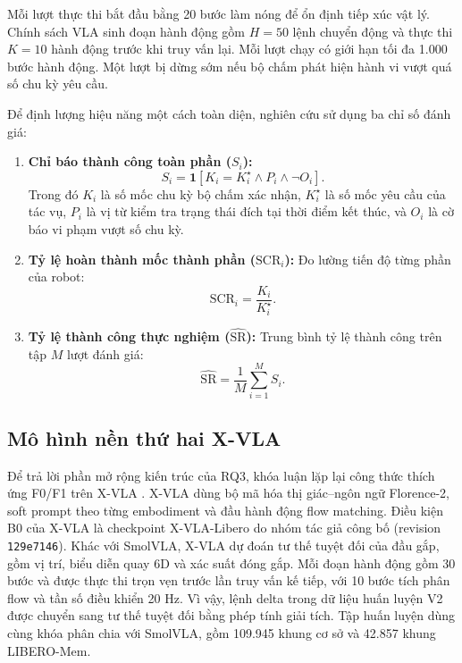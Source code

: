 Mỗi lượt thực thi bắt đầu bằng 20 bước làm nóng để ổn định tiếp xúc vật lý. Chính sách VLA sinh đoạn hành động gồm $H = 50$ lệnh chuyển động và thực thi $K = 10$ hành động trước khi truy vấn lại. Mỗi lượt chạy có giới hạn tối đa 1.000 bước hành động. Một lượt bị dừng sớm nếu bộ chấm phát hiện hành vi vượt quá số chu kỳ yêu cầu.

Để định lượng hiệu năng một cách toàn diện, nghiên cứu sử dụng ba chỉ số đánh giá:
\begin{enumerate}
    \item \textbf{Chỉ báo thành công toàn phần ($S_i$):}
    \begin{equation}
    S_i = \mathbf{1}[K_i = K_i^\star \land P_i \land \neg O_i].
    \end{equation}
    Trong đó $K_i$ là số mốc chu kỳ bộ chấm xác nhận, $K_i^\star$ là số mốc yêu cầu của tác vụ, $P_i$ là vị từ kiểm tra trạng thái đích tại thời điểm kết thúc, và $O_i$ là cờ báo vi phạm vượt số chu kỳ.
    \item \textbf{Tỷ lệ hoàn thành mốc thành phần ($\mathrm{SCR}_i$):} Đo lường tiến độ từng phần của robot:
    \begin{equation}
    \mathrm{SCR}_i = \frac{K_i}{K_i^\star}.
    \end{equation}
    \item \textbf{Tỷ lệ thành công thực nghiệm ($\widehat{\mathrm{SR}}$):} Trung bình tỷ lệ thành công trên tập $M$ lượt đánh giá:
    \begin{equation}
    \widehat{\mathrm{SR}} = \frac{1}{M}\sum_{i=1}^{M} S_i.
    \end{equation}
\end{enumerate}

\subsection{Mô hình nền thứ hai X-VLA}
\label{sec:xvla-setup}

Để trả lời phần mở rộng kiến trúc của RQ3, khóa luận lặp lại công thức thích ứng F0/F1 trên X-VLA \cite{xvla2025}. X-VLA dùng bộ mã hóa thị giác--ngôn ngữ Florence-2, soft prompt theo từng embodiment và đầu hành động flow matching. Điều kiện B0 của X-VLA là checkpoint X-VLA-Libero do nhóm tác giả công bố (revision \texttt{129e7146}). Khác với SmolVLA, X-VLA dự đoán tư thế tuyệt đối của đầu gắp, gồm vị trí, biểu diễn quay 6D và xác suất đóng gắp. Mỗi đoạn hành động gồm 30 bước và được thực thi trọn vẹn trước lần truy vấn kế tiếp, với 10 bước tích phân flow và tần số điều khiển 20 Hz. Vì vậy, lệnh delta trong dữ liệu huấn luyện V2 được chuyển sang tư thế tuyệt đối bằng phép tính giải tích. Tập huấn luyện dùng cùng khóa phân chia với SmolVLA, gồm 109.945 khung cơ sở và 42.857 khung LIBERO-Mem.

